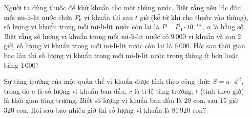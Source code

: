 \begin{bt}%
	Người ta dùng thuốc để  khử khuẩn cho một thùng nước. Biết rằng nếu lúc đầu mỗi mi-li-lit nước chứa $P_{0}$ vi khuẩn thì sau $t$ giờ (kể từ khi cho thuốc vào thùng), số lượng vi khuẩn trong mỗi mi-li-lit nước còn lại là $P=P_{0} \cdot 10^{-\alpha t}, \,\alpha$ là hằng số. Biết rằng số lượng vi khuẩn trong mỗi mi-li-lit nước có $9\,000$ vi khuẩn và sau 2 giờ, số lượng vi khuẩn trong mỗi mi-li-lit nước còn lại là $6\,000$. Hỏi sau thời gian bao lâu thì số lượng vi khuẩn trong mỗi mi-li-lit nước trong thùng ít hơn hoặc bằng $1\,000$?
\end{bt}

\begin{ex}%
	Sự tăng trưởng của một quần thể  vi khuẩn được tính theo công thức $S=a\cdot 4^{rt}$, trong đó $a$ là số lượng vi khuẩn ban đầu, $r$ là tỉ lệ tăng trưởng, $t$ (tính theo giờ) là thời gian tăng trưởng. Biết số lượng vi khuẩn ban đầu là $20$ con, sau $15$ giờ $320$ con. Hỏi sau bao nhiêu giờ thì số lượng vi khuẩn là $81\,920$ con?
\end{ex}

